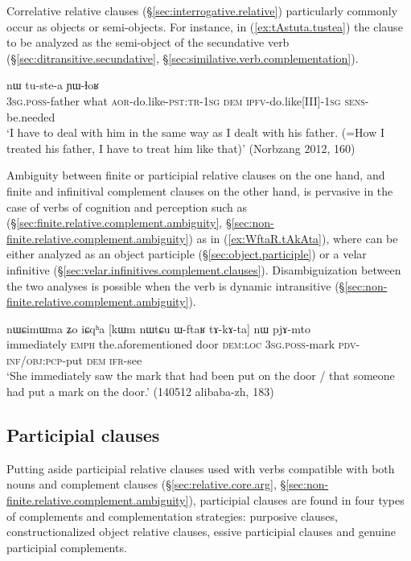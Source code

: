 Correlative relative clauses (§\ref{sec:interrogative.relative}) particularly commonly occur as objects or semi-objects. For instance, in (\ref{ex:tAstuta.tustea}) the clause  to be analyzed as the semi-object of the secundative verb  (§\ref{sec:ditransitive.secundative}, §\ref{sec:similative.verb.complementation}).

\begin{exe}
	\ex \label{ex:tAstuta.tustea}
	 nɯ tu-ste-a ɲɯ-ɬoʁ \\
	\textsc{3sg}.\textsc{poss}-father what \textsc{aor}-do.like-\textsc{pst}:\textsc{tr}-\textsc{1sg} \textsc{dem} \textsc{ipfv}-do.like[III]-\textsc{1sg} \textsc{sens}-be.needed \\
	\glt `I have to deal with him in the same way as I dealt with his father. (=How I treated his father, I have to treat him like that)' (Norbzang 2012, 160)
\end{exe}

Ambiguity between finite or participial relative clauses on the one hand, and finite and infinitival complement clauses on the other hand, is pervasive in the case of verbs of cognition and perception such as  (§\ref{sec:finite.relative.complement.ambiguity}, §\ref{sec:non-finite.relative.complement.ambiguity}) as in (\ref{ex:WftaR.tAkAta}), where  can be either analyzed as an object participle (§\ref{sec:object.participle}) or a velar infinitive (§\ref{sec:velar.infinitives.complement.clauses}). Disambiguization between the two analyses is possible when the verb is dynamic intransitive (§\ref{sec:non-finite.relative.complement.ambiguity}).

\begin{exe}
	\ex  \label{ex:WftaR.tAkAta}
	\gll nɯɕimɯma ʑo iɕqʰa [kɯm nɯtɕu ɯ-ftaʁ tɤ-kɤ-ta] nɯ pjɤ-mto \\
	immediately \textsc{emph} the.aforementioned door \textsc{dem}:\textsc{loc} \textsc{3sg}.\textsc{poss}-mark \textsc{pdv}-\textsc{inf}/\textsc{obj}:\textsc{pcp}-put \textsc{dem} \textsc{ifr}-see \\
	\glt `She immediately saw the mark that had been put on the door / that someone had put a mark on the door.' (140512 alibaba-zh, 183)
\end{exe}

\subsection{Participial clauses} \label{sec:participial.clause.complementation strategies}
Putting aside participial relative clauses used with verbs compatible with both nouns and complement clauses (§\ref{sec:relative.core.arg}, §\ref{sec:non-finite.relative.complement.ambiguity}), participial clauses are found in four types of complements and complementation strategies: purposive clauses, constructionalized object relative clauses, essive participial clauses and genuine participial complements.

